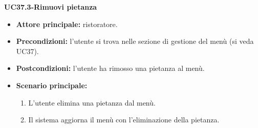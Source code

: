 \textbf{UC37.3-Rimuovi pietanza}  
\begin{itemize}
    \item \textbf{Attore principale:} ristoratore.
    \item \textbf{Precondizioni:} l'utente si trova nelle sezione di gestione del menù (si veda UC37).
    \item \textbf{Postcondizioni:} l'utente ha rimosso una pietanza al menù.
    \item \textbf{Scenario principale:}
    \begin{enumerate}
        \item L'utente elimina una pietanza dal menù.
        \item Il sistema aggiorna il menù con l'eliminazione della pietanza.
    \end{enumerate}
\end{itemize}


